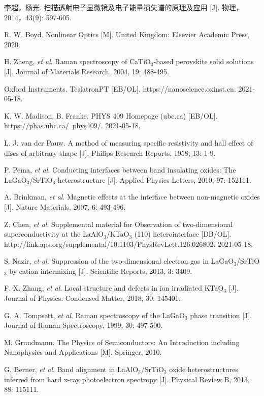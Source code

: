 \documentclass[12pt,a4paper,openany,twoside,UTF-8]{book}
\begin{document}
\begin{thebibliography}{99}
李超，杨光. 扫描透射电子显微镜及电子能量损失谱的原理及应用 [J]. 物理，2014，43(9): 597-605.

R. W. Boyd. Nonlinear Optics [M]. United Kingdom: Elsevier Academic Press, 2020.

H. Zheng, \textit{et al}. Raman spectroscopy of CaTiO$_3$-based perovskite solid solutions [J]. Journal of Materials Research, 2004, 19: 488-495.

Oxford Instruments. TeslatronPT [EB/OL]. https://nanoscience.oxinst.cn. 2021-05-18.

K. W. Madison, B. Franke. PHYS 409 Homepage (ubc.ca) [EB/OL]. https://phas.ubc.ca/~phys409/. 2021-05-18.

L. J. van der Pauw. A method of measuring specific resistivity and hall effect of discs of arbitrary shape [J]. Philips Research Reports, 1958, 13: 1-9.

P. Pema, \textit{et al}. Conducting interfaces between band insulating oxides: The LaGaO$_3$/SrTiO$_3$ heterostructure [J]. Applied Physics Letters, 2010, 97: 152111.

A. Brinkman, \textit{et al}. Magnetic effects at the interface between non-magnetic oxides [J]. Nature Materials, 2007, 6: 493-496.

Z. Chen, \textit{et al}. Supplemental material for Observation of two-dimensional superconductivity at the LaAlO$_3$/KTaO$_3$ (110) heterointerface [DB/OL]. http://link.aps.org/supplemental/10.1103/PhysRevLett.126.026802. 2021-05-18.

S. Nazir, \textit{et al}. Suppression of the two-dimensional electron gas in LaGaO$_3$/SrTiO$_3$ by cation intermixing [J]. Scientific Reports, 2013, 3: 3409.

F. X. Zhang, \textit{et al}. Local structure and defects in ion irradiated KTaO$_3$ [J]. Journal of Physics: Condensed Matter, 2018, 30: 145401.

G. A. Tompsett, \textit{et al}. Raman spectroscopy of the LaGaO$_3$ phase transition [J]. Journal of Raman Spectroscopy, 1999, 30: 497-500.

M. Grundmann. The Physics of Semiconductors: An Introduction including Nanophysics and Applications [M]. Springer, 2010.

G. Berner, \textit{et al}. Band alignment in LaAlO$_3$/SrTiO$_3$ oxide heterostructures inferred from hard x-ray photoelectron spectropy [J]. Physical Review B, 2013, 88: 115111.


\end{thebibliography}
\end{document}
